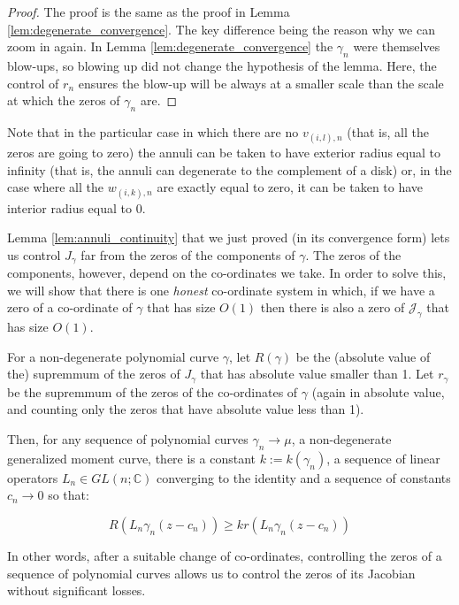 	\begin{proof}
		The proof is the same as the proof in Lemma \ref{lem:degenerate_convergence}. The key difference being the reason why we can zoom in again. In Lemma \ref{lem:degenerate_convergence} the $\gamma_n$ were themselves blow-ups, so blowing up did not change the hypothesis of the lemma. Here, the control of $r_n$ ensures the blow-up will be always at a smaller scale than the scale at which the zeros of $\gamma_n$ are.
	\end{proof}

	\begin{remark}
		Note that in the particular case in which there are no $v_{(i,l),n}$ (that is, all the zeros are going to zero) the annuli can be taken to have exterior radius equal to infinity (that is, the annuli can degenerate to the complement of a disk) or, in the case where all the $w_{(i,k),n}$ are exactly equal to zero, it can be taken to have interior radius equal to 0.
	\end{remark}

	Lemma \ref{lem:annuli_continuity} that we just proved (in its convergence form) lets us control  $J_\gamma$ far from the zeros of the components of $\gamma$. The zeros of the components, however, depend on the co-ordinates we take. In order to solve this, we will show that there is one \textit{honest} co-ordinate system in which, if we have a zero of a co-ordinate of $\gamma$ that has size $O(1)$ then there is also a zero of $\mathcal J_{\gamma}$ that has size $O(1)$.


	\begin{lemma}
	\label{lem:honest_zeros}
		For a non-degenerate polynomial curve $\gamma$, let $R(\gamma)$ be the (absolute value of the) supremmum of the zeros of $J_\gamma$ that has absolute value smaller than 1. Let $r_\gamma$ be the supremmum of the zeros of the co-ordinates of $\gamma$ (again in absolute value, and counting only the zeros that have absolute value less than 1).

		Then, for any sequence of polynomial curves $\gamma_n \to \mu$, a non-degenerate generalized moment curve, there is a constant $k := k(\gamma_n)$, a sequence of linear operators $L_n \in GL(n;\mathbb C)$ converging to the identity and a sequence of constants $c_n\to 0$ so that:

		\begin{equation}
			R(L_n \gamma_n(z-c_n)) \ge k r(L_n \gamma_n(z-c_n))
		\end{equation}

		In other words, after a suitable change of co-ordinates, controlling the zeros of a sequence of polynomial curves allows us to control the zeros of its Jacobian without significant losses.
 	\end{lemma}

